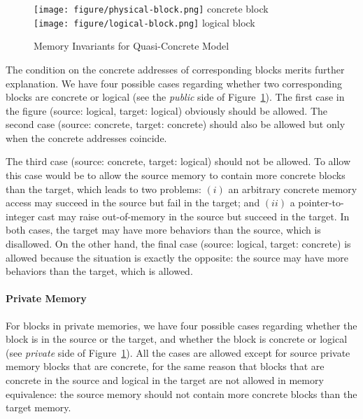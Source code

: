 \begin{figure}[t]
\center
  \begin{minipage}[b]{0.28\textwidth}
  \end{minipage}
  \begin{minipage}[b]{0.14\textwidth}
  \texttt{[image: figure/physical-block.png]} concrete block\\[2mm]
  \texttt{[image: figure/logical-block.png]} logical block\\
  \mbox{}
  \end{minipage}
\caption{Memory Invariants for Quasi-Concrete Model}\label{fig:invariant}
\end{figure}

The condition on the concrete addresses of corresponding blocks
merits further explanation. We have four possible cases
regarding whether two corresponding blocks are concrete or logical (see the
\emph{public} side of Figure~\ref{fig:invariant}).  The first case in
the figure (\ie source: logical, target: logical) obviously should be
allowed. The second case (\ie source: concrete, target: concrete)
should also be allowed but only when the concrete addresses
coincide. 

The third case (\ie source: concrete, target: logical) should not be
allowed. To allow this case would be to allow the source memory to contain more concrete
blocks than the target, which leads to two problems: $(i)$ an arbitrary
concrete memory access may succeed in the source but fail in the
target; and $(ii)$ a pointer-to-integer cast may raise out-of-memory
in the source but succeed in the target.  In both cases, the target
may have more behaviors than the source, which is disallowed.  On the
other hand, the final case (\ie source: logical, target: concrete) is
allowed because the situation is exactly the opposite: the source may
have more behaviors than the target, which is allowed.

\paragraph{Private Memory}
For blocks in private memories, we have four possible cases
regarding whether the block is in the source or the target, and
whether the block is concrete or logical (see \emph{private} side of
Figure~\ref{fig:invariant}).  All the cases are allowed except for
source private memory blocks that are concrete, for the same reason
that blocks that are concrete in the source and logical in the target are not
allowed in memory equivalence: the source memory should not contain
more concrete blocks than the target memory.

